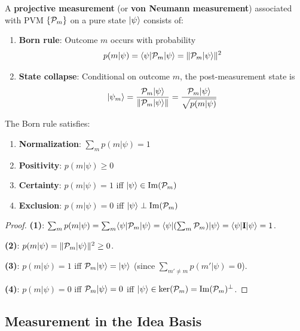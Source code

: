 \begin{definition}
\label{def:projective-measurement}
A \textbf{projective measurement} (or \textbf{von Neumann measurement}) associated with PVM $\{\mathcal{P}_m\}$ on a pure state $|\psi\rangle$ consists of:
\begin{enumerate}
  \item \textbf{Born rule}: Outcome $m$ occurs with probability
  \[
  p(m|\psi) = \langle \psi|\mathcal{P}_m|\psi\rangle = \|\mathcal{P}_m|\psi\rangle\|^2
  \]

  \item \textbf{State collapse}: Conditional on outcome $m$, the post-measurement state is
  \[
  |\psi_m\rangle = \frac{\mathcal{P}_m|\psi\rangle}{\|\mathcal{P}_m|\psi\rangle\|} = \frac{\mathcal{P}_m|\psi\rangle}{\sqrt{p(m|\psi)}}
  \]
\end{enumerate}
\end{definition}

\begin{proposition}
\label{prop:born-rule}
The Born rule satisfies:
\begin{enumerate}
  \item \textbf{Normalization}: $\sum_m p(m|\psi) = 1$
  \item \textbf{Positivity}: $p(m|\psi) \geq 0$
  \item \textbf{Certainty}: $p(m|\psi) = 1$ iff $|\psi\rangle \in \mathrm{Im}(\mathcal{P}_m)$
  \item \textbf{Exclusion}: $p(m|\psi) = 0$ iff $|\psi\rangle \perp \mathrm{Im}(\mathcal{P}_m)$
\end{enumerate}
\end{proposition}

\begin{proof}
\textbf{(1)}: $\sum_m p(m|\psi) = \sum_m \langle \psi|\mathcal{P}_m|\psi\rangle = \langle \psi|(\sum_m \mathcal{P}_m)|\psi\rangle = \langle \psi|\mathbf{I}|\psi\rangle = 1$.

\textbf{(2)}: $p(m|\psi) = \|\mathcal{P}_m|\psi\rangle\|^2 \geq 0$.

\textbf{(3)}: $p(m|\psi) = 1$ iff $\mathcal{P}_m|\psi\rangle = |\psi\rangle$ (since $\sum_{m' \neq m} p(m'|\psi) = 0$).

\textbf{(4)}: $p(m|\psi) = 0$ iff $\mathcal{P}_m|\psi\rangle = 0$ iff $|\psi\rangle \in \ker(\mathcal{P}_m) = \mathrm{Im}(\mathcal{P}_m)^\perp$.
\end{proof}

\subsection{Measurement in the Idea Basis}

